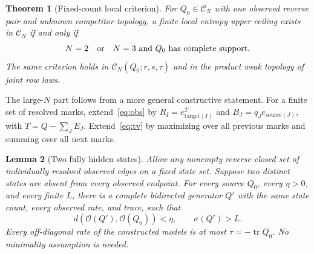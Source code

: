 \documentclass[aps,pre,onecolumn,11pt,longbibliography,notitlepage]{revtex4-2}
\newtheorem{theorem}{Theorem}
\newtheorem{lemma}[theorem]{Lemma}
\newcommand{\1}{\mathbf 1}
\newcommand{\C}{\mathcal C}
\newcommand{\Obs}{\mathcal O}
\newcommand{\tr}{\operatorname{tr}}
\newcommand{\sig}{\sigma}
\begin{document}
\begin{theorem}[Fixed-count local criterion]\label{thm:ceiling}
For $Q_0\in\C_N$ with one observed reverse pair and unknown competitor topology, a finite local entropy upper ceiling exists in $\C_N$ if and only if
\begin{equation}
 N=2\quad\hbox{or}\quad N=3\ \hbox{and $Q_0$ has complete support}.\label{eq:criterion}
\end{equation}
The same criterion holds in $\C_N(Q_0;r,s,\tau)$ and in the product weak topology of joint row laws.
\end{theorem}

The large-$N$ part follows from a more general constructive statement. For a finite set of resolved marks, extend~\eqref{eq:obs} by $R_I=e_{\mathrm{target}(I)}^T$ and $B_J=q_J e_{\mathrm{source}(J)}$, with $T=Q-\sum_J E_J$. Extend~\eqref{eq:tv} by maximizing over all previous marks and summing over all next marks.
\begin{lemma}[Two fully hidden states]\label{lem:neighborhood}
Allow any nonempty reverse-closed set of individually resolved observed edges on a fixed state set. Suppose two distinct states are absent from every observed endpoint. For every source $Q_0$, every $\eta>0$, and every finite $L$, there is a complete bidirected generator $Q'$ with the same state count, every observed rate, and trace, such that
\begin{equation}
 d(\Obs(Q'),\Obs(Q_0))<\eta,\qquad\sig(Q')>L.
\end{equation}
Every off-diagonal rate of the constructed models is at most $\tau=-\tr Q_0$. No minimality assumption is needed.
\end{lemma}
\end{document}

